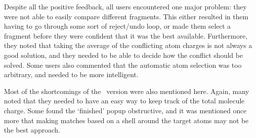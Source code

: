 Despite all the positive feedback, all users encountered one major problem: they were not able to easily compare different fragments. This either resulted in them having to go through some sort of reject/undo loop, or made them select a fragment before they were confident that it was the best available. Furthermore, they noted that taking the average of the conflicting atom charges is not always a good solution, and they needed to be able to decide how the conflict should be solved. Some users also commented that the automatic atom selection was too arbitrary, and needed to be more intelligent.

Most of the shortcomings of the \IDa\ version were also mentioned here. Again, many noted that they needed to have an easy way to keep track of the total molecule charge. Some found the `finished' popup obstructive, and it was mentioned once more that making matches based on a shell around the target atoms may not be the best approach.

